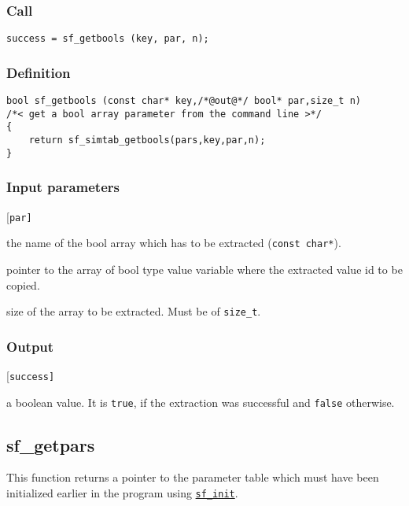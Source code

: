 \subsubsection*{Call}
\begin{verbatim}success = sf_getbools (key, par, n);\end{verbatim}

\subsubsection*{Definition}
\begin{verbatim}
bool sf_getbools (const char* key,/*@out@*/ bool* par,size_t n) 
/*< get a bool array parameter from the command line >*/
{
    return sf_simtab_getbools(pars,key,par,n);
} 
\end{verbatim}

\subsubsection*{Input parameters}
\begin{desclist}{\tt }{\quad}[\tt par]
   \setlength\itemsep{0pt}
   \item[key] the name of the bool array which has to be extracted (\texttt{const char*}).
   \item[par] pointer to the array of bool type value variable where the extracted value id to be copied. 
   \item[n] size of the array to be extracted. Must be of \texttt{size\_t}.
\end{desclist}

\subsubsection*{Output}
\begin{desclist}{\tt }{\quad}[\tt success]
   \setlength\itemsep{0pt}
   \item[success]  a boolean value. It is \texttt{true}, if the extraction was successful and \texttt{false} otherwise. 
\end{desclist}




\subsection{{sf\_getpars}}
This function  returns a pointer to the parameter table which must have been initialized earlier in the program using \hyperref[sec:sf_init]{\texttt{sf\_init}}.


